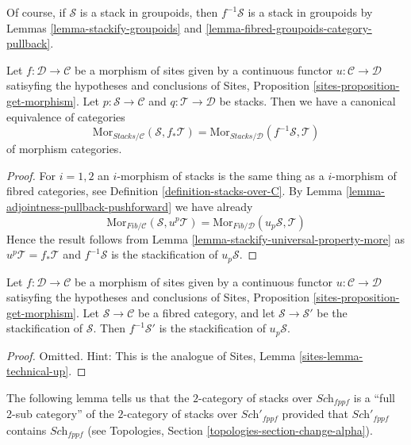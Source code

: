 \noindent
Of course, if $\mathcal{S}$ is a stack in groupoids, then $f^{-1}\mathcal{S}$
is a stack in groupoids by
Lemmas \ref{lemma-stackify-groupoids} and
\ref{lemma-fibred-groupoids-category-pullback}.

\begin{lemma}
\label{lemma-adjointness-pullback-pushforward-stacks}
Let $f : \mathcal{D} \to \mathcal{C}$ be a morphism of sites
given by a continuous functor $u : \mathcal{C} \to \mathcal{D}$
satisyfing the hypotheses and conclusions of
Sites, Proposition \ref{sites-proposition-get-morphism}.
Let $p : \mathcal{S} \to \mathcal{C}$ and
$q : \mathcal{T} \to \mathcal{D}$ be stacks.
Then we have a canonical equivalence of categories
$$
\text{Mor}_{\textit{Stacks}/\mathcal{C}}(\mathcal{S}, f_*\mathcal{T})
=
\text{Mor}_{\textit{Stacks}/\mathcal{D}}(f^{-1}\mathcal{S}, \mathcal{T})
$$
of morphism categories.
\end{lemma}

\begin{proof}
For $i = 1, 2$ an $i$-morphism of stacks is the same thing as a
$i$-morphism of fibred categories, see
Definition \ref{definition-stacks-over-C}.
By
Lemma \ref{lemma-adjointness-pullback-pushforward}
we have already
$$
\text{Mor}_{\textit{Fib}/\mathcal{C}}(\mathcal{S}, u^p\mathcal{T})
=
\text{Mor}_{\textit{Fib}/\mathcal{D}}(u_p\mathcal{S}, \mathcal{T})
$$
Hence the result follows from
Lemma \ref{lemma-stackify-universal-property-more}
as $u^p\mathcal{T} = f_*\mathcal{T}$ and $f^{-1}\mathcal{S}$ is the
stackification of $u_p\mathcal{S}$.
\end{proof}

\begin{lemma}
\label{lemma-technical-up}
Let $f : \mathcal{D} \to \mathcal{C}$ be a morphism of sites
given by a continuous functor $u : \mathcal{C} \to \mathcal{D}$
satisyfing the hypotheses and conclusions of
Sites, Proposition \ref{sites-proposition-get-morphism}.
Let $\mathcal{S} \to \mathcal{C}$ be a fibred category, and
let $\mathcal{S} \to \mathcal{S}'$ be the stackification of $\mathcal{S}$.
Then $f^{-1}\mathcal{S}'$ is the stackification of
$u_p\mathcal{S}$.
\end{lemma}

\begin{proof}
Omitted. Hint:
This is the analogue of Sites, Lemma \ref{sites-lemma-technical-up}.
\end{proof}

\noindent
The following lemma tells us that the $2$-category of stacks
over $\textit{Sch}_{fppf}$ is a ``full 2-sub category'' of the
$2$-category of stacks over $\textit{Sch}'_{fppf}$ provided that
$\textit{Sch}'_{fppf}$ contains $\textit{Sch}_{fppf}$ (see
Topologies, Section \ref{topologies-section-change-alpha}).

